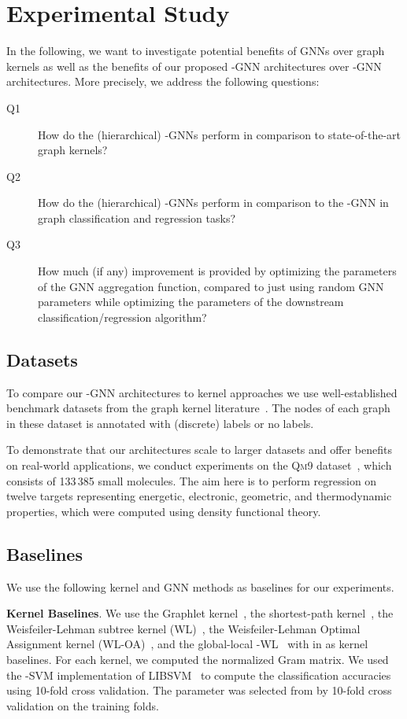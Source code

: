 \documentclass[letterpaper]{article}
\theoremstyle{definition}
\newcommand{\xhdr}[1]{{\noindent\bfseries #1}.}
\begin{document}
\section{Experimental Study}

In the following, we want to investigate potential benefits of GNNs over graph kernels as well as the benefits of our proposed -GNN architectures over -GNN architectures. More precisely, we address the following questions:
\begin{description}
	\item[Q1] How do the (hierarchical) -GNNs perform in comparison to state-of-the-art graph kernels? 
	\item[Q2] How do the (hierarchical)  -GNNs perform in comparison to the -GNN in graph classification and regression tasks?
	\item[Q3]
	How much (if any) improvement is provided by optimizing the parameters of the GNN aggregation function, compared to just using random GNN parameters while optimizing the parameters of the downstream classification/regression algorithm?
\end{description}

\subsection{Datasets }
To compare our -GNN architectures to kernel approaches we use well-established benchmark datasets from the graph kernel literature~\cite{KKMMN2016}. The nodes of each graph in these dataset is annotated with (discrete) labels or no labels. 

To demonstrate that our architectures scale to larger datasets and offer benefits on real-world applications, we conduct experiments on the \textsc{Qm9} dataset~\cite{Ram+2014,Rud+2012,Wu+2018}, which consists of 133\,385 small molecules. The aim here is to perform regression on twelve targets representing energetic, electronic, geometric, and thermodynamic properties, which were computed using density functional theory.


\subsection{Baselines}

We use the following kernel and GNN methods as baselines for our experiments.

\xhdr{Kernel Baselines} We use the Graphlet kernel~\cite{She+2009}, the shortest-path kernel~\cite{Borgwardt2005}, the Weisfeiler-Lehman subtree kernel (\textsc{WL})~\cite{She+2011}, the Weisfeiler-Lehman Optimal Assignment kernel (\textsc{WL-OA})~\cite{Kri+2016}, and the global-local -WL~\cite{Mor+2017} with  in  as kernel baselines. 
For each kernel, we computed the normalized Gram matrix. 
We used the -SVM implementation of LIBSVM~\cite{Cha+2011} to compute the classification accuracies using 10-fold cross validation. 
The parameter  was selected from   by 10-fold cross validation on the training folds. 
\end{document}
